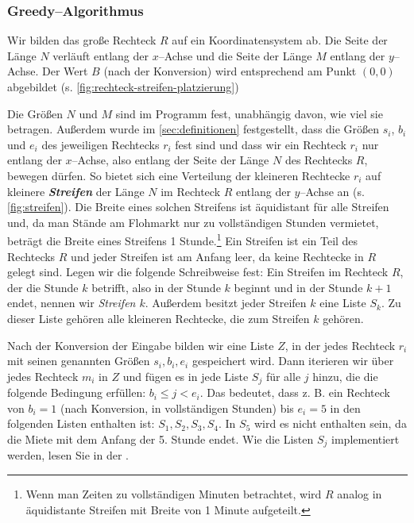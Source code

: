 \subsubsection{Greedy--Algorithmus}\label{sec:greedy}

Wir bilden das große Rechteck $R$ auf ein Koordinatensystem ab.
Die Seite der Länge $N$ verläuft entlang der $x$--Achse und die Seite der Länge
$M$ entlang der $y$--Achse.
Der Wert $B$ (nach der Konversion) wird entsprechend am Punkt $(0, 0)$ abgebildet (s. \cref{fig:rechteck-streifen-platzierung})

Die Größen $N$ und $M$ sind im Programm fest, unabhängig davon, wie viel sie betragen.
Außerdem wurde im \cref{sec:definitionen} festgestellt, dass die Größen $s_i$, $b_i$ und $e_i$
des jeweiligen Rechtecks $r_i$ fest sind und dass wir ein Rechteck $r_i$ nur entlang der $x$--Achse,
also entlang der Seite der Länge $N$ des Rechtecks $R$, bewegen dürfen.
So bietet sich eine Verteilung der kleineren Rechtecke $r_i$ auf kleinere \textit{\textbf{Streifen}}
der Länge $N$ im Rechteck $R$ entlang der $y$--Achse an (s. \cref{fig:streifen}).
Die Breite eines solchen Streifens ist äquidistant für alle Streifen und, da
man Stände am Flohmarkt nur zu vollständigen Stunden vermietet, 
beträgt die Breite eines Streifens 1 Stunde.\footnote{Wenn man Zeiten zu
vollständigen Minuten betrachtet,
wird $R$ analog in äquidistante Streifen mit Breite von 1 Minute aufgeteilt.}
Ein Streifen ist ein Teil des Rechtecks $R$ und jeder Streifen ist
am Anfang leer, da keine Rechtecke in $R$ gelegt sind.
Legen wir die folgende Schreibweise fest: Ein Streifen im Rechteck $R$, der die
Stunde $k$ betrifft, also in der Stunde $k$ beginnt und in der Stunde $k+1$ endet, nennen wir 
\textit{Streifen $k$}. Außerdem besitzt jeder Streifen $k$ eine Liste $S_k$.
Zu dieser Liste gehören alle kleineren Rechtecke, die zum Streifen $k$ gehören.

Nach der Konversion der Eingabe bilden wir eine Liste $Z$, in der jedes
Rechteck $r_i$ mit seinen genannten Größen $s_i, b_i, e_i$ gespeichert wird.
Dann iterieren wir über jedes Rechteck $m_i$ in $Z$ und fügen es in jede Liste $S_j$ für alle
$j$ hinzu, die die folgende Bedingung erfüllen: $b_i \leqslant j < e_i$.
Das bedeutet, dass z. B. ein Rechteck von $b_i = 1$ (nach Konversion, in vollständigen Stunden)
bis $e_i = 5$ in den folgenden Listen enthalten ist: $S_1, S_2, S_3, S_4$.
In $S_5$ wird es nicht enthalten sein, da die Miete mit dem Anfang der 5. Stunde endet.
Wie die Listen $S_j$ implementiert werden, lesen Sie in der .


